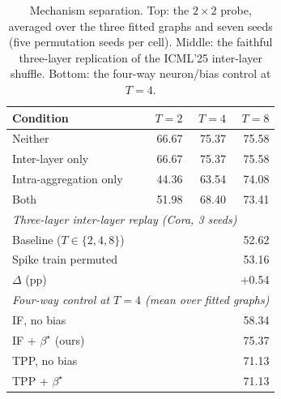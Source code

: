\begin{table}[t]
\centering
\small
\caption{Mechanism separation. Top: the $2\times2$ probe, averaged over the three
fitted graphs and seven seeds (five permutation seeds per cell). Middle: the faithful
three-layer replication of the ICML'25 inter-layer shuffle. Bottom: the four-way
neuron/bias control at $T{=}4$.}
\label{tab:s1}
\begin{tabular}{lrrr}
\toprule
Condition & $T{=}2$ & $T{=}4$ & $T{=}8$ \\
\midrule
Neither & 66.67 & 75.37 & 75.58 \\
Inter-layer only & 66.67 & 75.37 & 75.58 \\
Intra-aggregation only & 44.36 & 63.54 & 74.08 \\
Both & 51.98 & 68.40 & 73.41 \\
\midrule
\multicolumn{4}{l}{\emph{Three-layer inter-layer replay (Cora, 3 seeds)}} \\
Baseline ($T{\in}\{2,4,8\}$) & \multicolumn{3}{r}{52.62} \\
Spike train permuted & \multicolumn{3}{r}{53.16} \\
$\Delta$ (pp) & \multicolumn{3}{r}{+0.54} \\
\midrule
\multicolumn{4}{l}{\emph{Four-way control at $T{=}4$ (mean over fitted graphs)}} \\
IF, no bias & \multicolumn{3}{r}{58.34} \\
IF + $\beta^\star$ (ours) & \multicolumn{3}{r}{75.37} \\
TPP, no bias & \multicolumn{3}{r}{71.13} \\
TPP + $\beta^\star$ & \multicolumn{3}{r}{71.13} \\
\bottomrule
\end{tabular}
\end{table}
